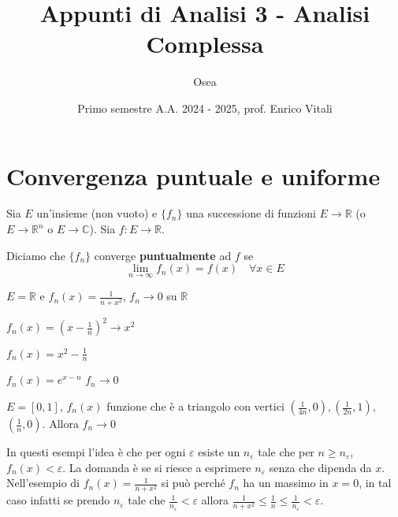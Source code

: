 

\title{Appunti di Analisi 3 \-- Analisi Complessa}
\author{Osea}
\date{Primo semestre A.A. 2024 \-- 2025, prof. Enrico Vitali}



\maketitle

\section{Convergenza puntuale e uniforme}
Sia \(E\) un'insieme (non vuoto) e \(\{f_{n}\} \) una successione di funzioni
\(E \to \mathbb{R}\) (o \(E \to \mathbb{R}^{n}\) o \(E \to \mathbb{C}\)). Sia
\(f: E \to \mathbb{R}\).
\begin{definition}
    Diciamo che \(\{f_{n}\} \) converge \textbf{puntualmente} ad \(f\) se 
    \[
        \lim_{n \to \infty} f_{n}(x) = f(x) \quad \forall x \in E
    \]
\end{definition}
\begin{example}
    \(E = \mathbb{R}\) e \(f_{n}(x) = \frac{1}{n + x^2}\), \(f_{n} \to 0\) su
    \(\mathbb{R}\) 
\end{example}
\begin{example}
\(f_{n}(x) = {\left( x - \frac{1}{n} \right)}^2 \to x^2\)
\end{example}
\begin{example}
    \(f_{n}(x) = x^2 - \frac{1}{n}\) 
\end{example}
\begin{example}
    \(f_{n}(x) = e^{x - n}\) 
    \(f_{n} \to 0\) 
\end{example}

\begin{example}
    \(E = [0, 1]\), \(f_{n}(x) \) funzione che è a triangolo con vertici
    \((\frac{1}{4n}, 0), (\frac{1}{2n}, 1)\), \( (\frac{1}{n}, 0)\). Allora
    \(f_{n} \to 0\)
\end{example}

In questi esempi l'idea è che per ogni \(\varepsilon\) esiste un
\(n_\varepsilon\) tale che per \(n\ge n_\varepsilon\), \(f_{n}(x) <
\varepsilon\). La domanda è se si riesce a esprimere \(n_\varepsilon\) senza che
dipenda da \(x\).
Nell'esempio di \(f_{n}(x) = \frac{1}{n+x^2}\) si può perché \(f_{n}\) ha un
massimo in \(x = 0\), in tal caso infatti se prendo \(n_\varepsilon \) tale che
\(\frac{1}{n_\varepsilon} < \varepsilon\) allora \(\frac{1}{n+x^2}\le
\frac{1}{n} \le \frac{1}{n_\varepsilon} < \varepsilon\).

